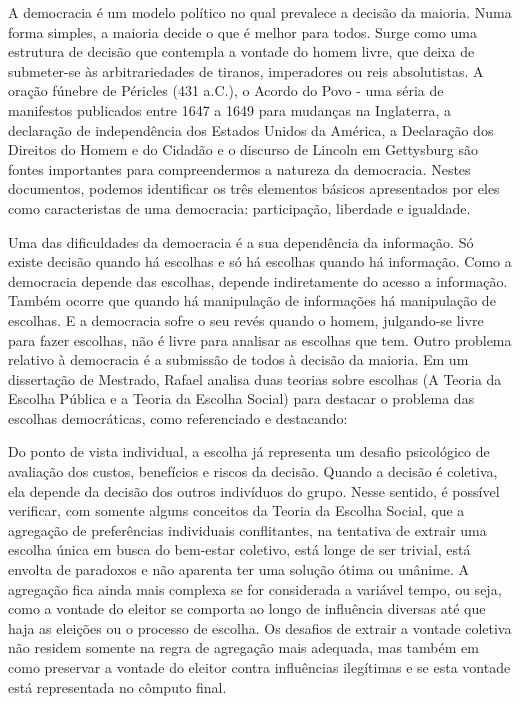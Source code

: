 


A democracia é um modelo político no qual prevalece a decisão da maioria. Numa forma simples, a maioria decide o que é melhor para todos. Surge como uma estrutura de decisão que contempla a vontade do homem livre, que deixa de submeter-se às arbitrariedades de tiranos, imperadores ou reis absolutistas. A oração fúnebre de Péricles (431 a.C.), o Acordo do Povo - uma séria de manifestos publicados entre 1647 a 1649 para mudanças na Inglaterra, a declaração de independência dos Estados Unidos da América, a Declaração dos Direitos do Homem e do Cidadão e o discurso de Lincoln em Gettysburg são fontes importantes para compreendermos a natureza da democracia. Nestes documentos, podemos identificar  os três elementos básicos apresentados por eles como caracteristas de uma democracia: participação, liberdade e igualdade.

Uma das dificuldades da democracia é a sua dependência da informação. Só existe decisão quando há escolhas e só há escolhas quando há informação. Como a democracia depende das escolhas, depende indiretamente do acesso a informação. Também ocorre que quando há manipulação de informações há manipulação de escolhas. E a democracia sofre o seu revés quando o homem, julgando-se livre para fazer escolhas, não é livre para analisar as escolhas que tem. 
Outro problema relativo à democracia é a submissão de todos à decisão da maioria. Em um dissertação de Mestrado, Rafael  analisa duas teorias sobre escolhas (A Teoria da Escolha Pública e a Teoria da Escolha Social) para destacar o problema das escolhas democráticas, como referenciado e destacando:

\begin{citacao}
Do ponto de vista individual, a escolha já representa um desafio psicológico de
avaliação dos custos, benefícios e riscos da decisão. Quando a decisão é coletiva, ela depende
da decisão dos outros indivíduos do grupo. Nesse sentido, é possível verificar, com somente
alguns conceitos da Teoria da Escolha Social, que a agregação de preferências individuais
conflitantes, na tentativa de extrair uma escolha única em busca do bem-estar coletivo,
está longe de ser trivial, está envolta de paradoxos e não aparenta ter uma solução ótima ou unânime. A agregação fica ainda mais complexa se for considerada a variável tempo, ou seja, como a vontade do eleitor se comporta ao longo de influência diversas até que haja as eleições ou o processo de escolha. Os desafios de extrair a vontade coletiva não residem somente na regra de agregação mais adequada, mas também em como preservar a vontade do eleitor contra influências ilegítimas e se esta vontade está representada no cômputo final.

\end{citacao}

